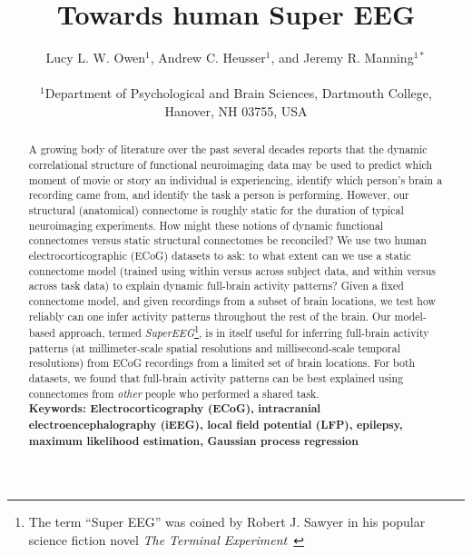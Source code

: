 \documentclass[12pt]{article}
\title{Towards human Super EEG}
\author
{Lucy L. W. Owen$^{1}$, Andrew C. Heusser$^{1}$, and Jeremy R. Manning$^{1\ast}$\\
\\
\normalsize{$^{1}$Department of Psychological and Brain Sciences,
  Dartmouth College,}\\
\normalsize{Hanover, NH 03755, USA}
}
\date{}
\begin{document}
 


\baselineskip24pt


\maketitle 

\begin{abstract}
A growing body of literature over the past several decades reports that the dynamic correlational structure of functional neuroimaging data may be used to predict which moment of movie or story an individual is experiencing, identify which person's brain a recording came from, and identify the task a person is performing.  However, our structural (anatomical) connectome is roughly static for the duration of typical neuroimaging experiments.  How might these notions of dynamic functional connectomes versus static structural connectomes be reconciled?  We use two human electrocorticographic (ECoG) datasets to ask: to what extent can we use a static connectome model (trained using within versus across subject data, and within versus across task data) to explain dynamic full-brain activity patterns?  Given a fixed connectome model, and given recordings from a subset of brain locations, we test how reliably can one infer activity patterns throughout the rest of the brain.  Our model-based approach, termed \textit{SuperEEG}\footnote{The term ``Super EEG'' was
coined by Robert J. Sawyer in his popular science fiction novel
\textit{The Terminal Experiment}~\cite{Sawy95}}, is in itself useful for inferring full-brain activity patterns (at millimeter-scale spatial resolutions and millisecond-scale temporal resolutions) from ECoG recordings from a limited set of brain locations.  For both datasets, we found that full-brain activity patterns can be best explained using connectomes from \textit{other} people who performed a shared task.\\

\small{\textbf{Keywords: Electrocorticography (ECoG), intracranial electroencephalography (iEEG),
local field potential (LFP), epilepsy, maximum likelihood estimation, Gaussian process regression}}
\end{abstract}
\end{document}
